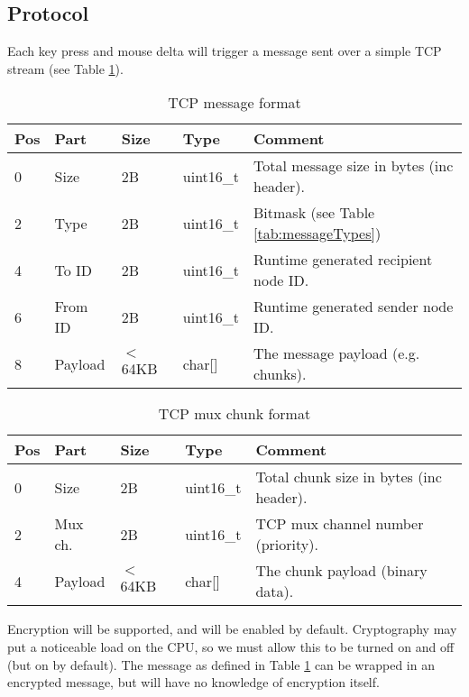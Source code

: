 \subsection{Protocol}

Each key press and mouse delta will trigger a message sent over a simple TCP 
stream (see Table \ref{tab:messageFormat}).

\begin{table}[ht!]
  \begin{tabular}{|l|l|l|l|l|}
    \hline
    \textbf{Pos} &
    \textbf{Part} &
    \textbf{Size} &
    \textbf{Type} &
    \textbf{Comment} \\
    \hline
    0 & Size & 2B & uint16\_t & Total message size in bytes (inc header). \\
    2 & Type & 2B & uint16\_t & Bitmask (see Table \ref{tab:messageTypes}) \\
    4 & To ID & 2B & uint16\_t & Runtime generated recipient node ID. \\
    6 & From ID & 2B & uint16\_t & Runtime generated sender node ID. \\
    8 & Payload & $<$64KB & char[] & The message payload (e.g. chunks). \\
    \hline
  \end{tabular}
  \caption{TCP message format}
  \label{tab:messageFormat}
\end{table}

\begin{table}[ht!]
  \begin{tabular}{|l|l|l|l|l|}
    \hline
    \textbf{Pos} &
    \textbf{Part} &
    \textbf{Size} &
    \textbf{Type} &
    \textbf{Comment} \\
    \hline
    0 & Size & 2B & uint16\_t & Total chunk size in bytes (inc header). \\
    2 & Mux ch. & 2B & uint16\_t & TCP mux channel number (priority). \\
    4 & Payload & $<$64KB & char[] & The chunk payload (binary data). \\
    \hline
  \end{tabular}
  \caption{TCP mux chunk format}
  \label{tab:chunkFormat}
\end{table}

Encryption will be supported, and will be enabled by default. Cryptography may 
put a noticeable load on the CPU, so we must allow this to be turned on and off
(but on by default). The message as defined in Table \ref{tab:messageFormat}
can be wrapped in an encrypted message, but will have no knowledge of encryption
itself.

